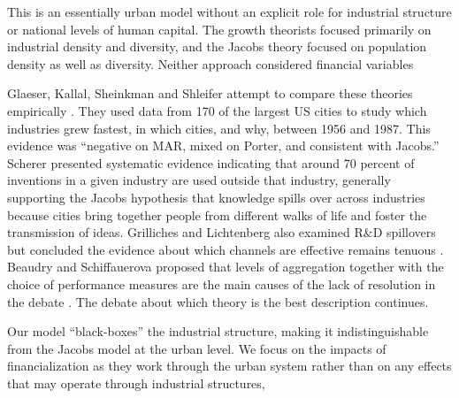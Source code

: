 This is an essentially urban model without an explicit role for industrial structure or national levels of human capital.  The growth theorists focused primarily on industrial density and diversity, and the Jacobs theory focused on population density as well as diversity. Neither approach considered financial variables


 Glaeser, Kallal, Sheinkman and Shleifer attempt to compare these theories empirically \cite{glaeserGrowthCities1991}. They used data from 170 of the largest US cities to study which industries grew fastest, in which cities, and why, between 1956 and 1987. %
This evidence was ``negative on MAR, mixed on Porter, and consistent with Jacobs.'' Scherer \cite{schererInterindustryTechnologyFlows1982} presented systematic evidence indicating that around 70 percent of inventions in a given industry are used outside that industry, generally supporting the Jacobs hypothesis that knowledge spills over across industries because cities bring together people from different walks of life and foster the transmission of ideas. Grilliches and Lichtenberg also examined R\&D spillovers but concluded the evidence about which channels are effective remains tenuous \cite{grilichesInterindustryTechnologyFlows1984}. Beaudry and Schiffauerova proposed that levels of aggregation together with the choice of performance measures are the main causes of the lack of resolution in the debate \cite{beaudryWhoRightMarshall2009}. The debate about which theory is the best description continues. 

Our model ``black-boxes'' the industrial structure, making it indistinguishable from the Jacobs model at the urban level. We focus on the impacts of financialization as they work through the urban system rather than on any effects that may operate through industrial structures,


